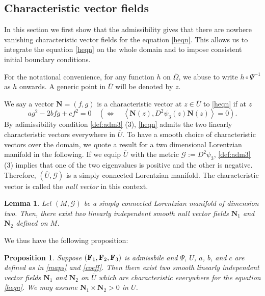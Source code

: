 \documentclass[11pt]{amsart}
\theoremstyle{plain}
\newtheorem{Prop}[Thm]{Proposition}
\newtheorem{Lem}[Thm]{Lemma}
\theoremstyle{remark}
\numberwithin{equation}{section}
\numberwithin{Thm}{section}
\def\U{\overline{U}}
\def\N{{\mathbf N}}
\def\F{{\bf F}}
\begin{document}

\subsection{Characteristic vector fields}\label{sect.char}

In this section we first show that the admissibility gives that there are nowhere vanishing characteristic vector fields for the equation \eqref{heqn}. This allows us to integrate the equation \eqref{heqn} on the whole domain and to impose consistent initial boundary conditions. 

For the notational convenience, for any function $h$ on $\overline\Omega$, we abuse to write $h\circ \Psi^{-1}$ as $h$ onwards. A generic point in $\U$ will be denoted by $z$.

We say a vector $\N=(f,g)$ is a characteristic vector at $z\in \U$ to \eqref{heqn} if at $z$
$$a g^2 - 2b fg + c f^2 = 0 \quad \left( \Longleftrightarrow \quad \left<\N(z), D^2\psi_3(z) \N(z)\right> = 0\right).$$
By adimissibility condition \ref{def:adm3} (3), \eqref{heqn} admits the two linearly characteristic vectors everywhere in $\overline{U}$. To have a smooth choice of characteristic vectors over the domain, we quote a result for a two dimensional Lorentzian manifold in the following. If we equip $\overline U$ with the metric $\mathscr{G}:=D^2 \psi_3$, \ref{def:adm3} (3) implies that one of the two eigenvalues is positive and the other is negative. Therefore, $(\U,\mathscr{G})$ is a simply connected Lorentzian manifold. The characteristic vector is called the {\it null vector} in this context.%
\begin{Lem}\cite[Proposition 3.37]{MR1384756}\label{lemma:GHL}
Let $(M,\mathscr{G})$ be a simply connected Lorentzian manifold of dimension two. Then, there exist two linearly independent smooth null vector fields $\N_1$ and $\N_2$ defined on $M$.
\end{Lem}
We thus have the following proposition:
\begin{Prop}\label{prop:separability} Suppose $(\F_1,\F_2,\F_3)$ is admissbile and $\Psi$, $U$, $a$, $b$, and $c$ are defined as in \eqref{maps} and \eqref{coeff}. Then there exist two smooth linearly independent vector fields $\N_1$ and $\N_2$ on $\overline U$ which are characteristic everywhere for the equation \eqref{heqn}. We may assume $\N_1 \times \N_2 > 0$ in $\overline U$.
\end{Prop}
\end{document}
